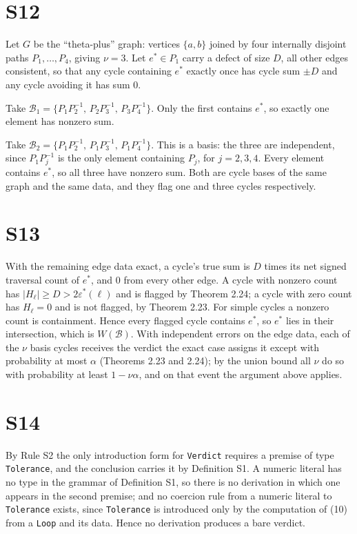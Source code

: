 \documentclass[11pt,a4paper]{article}
\theoremstyle{definition}
\theoremstyle{remark}
\newcommand{\abs}[1]{\lvert#1\rvert}
\newcommand{\eps}{\varepsilon}
\newcommand{\epsstar}{\eps^{\ast}}
\newcommand{\hol}{H}
\newcommand{\cf}[1]{\texttt{#1}}
\begin{document}
\section*{S12}
Let $G$ be the ``theta-plus'' graph: vertices $\{a,b\}$ joined by four
internally disjoint paths $P_1,\dots,P_4$, giving
$\nu = 3$. Let $e^{\ast}\in P_1$ carry a defect of size $D$, all other
edges consistent, so that any cycle containing $e^{\ast}$ exactly once
has cycle sum $\pm D$ and any cycle avoiding it has sum $0$.

Take $\mathcal{B}_1 = \{P_1P_2^{-1},\,P_2P_3^{-1},\,P_3P_4^{-1}\}$.
Only the first contains $e^{\ast}$, so exactly one element has nonzero
sum.

Take $\mathcal{B}_2 = \{P_1P_2^{-1},\,P_1P_3^{-1},\,P_1P_4^{-1}\}$.
This is a basis: the three are independent, since $P_1P_j^{-1}$ is the
only element containing $P_j$, for $j=2,3,4$. Every element
contains $e^{\ast}$, so all three have nonzero sum. Both are cycle bases
of the same graph and the same data, and they flag one and three cycles
respectively.

\section*{S13}
With the remaining edge data exact, a cycle's true sum is $D$ times its
net signed traversal count of $e^{\ast}$, and $0$ from every other edge.
A cycle with nonzero count has $\abs{\hol_\ell}\ge D>2\epsstar(\ell)$
and is flagged by Theorem 2.24; a cycle with zero count has
$\hol_\ell=0$ and is not flagged, by Theorem 2.23. For
simple cycles a nonzero count is containment. Hence every flagged cycle
contains $e^{\ast}$, so $e^{\ast}$ lies in their intersection, which is
$W(\mathcal{B})$. With independent errors on the edge data, each of the
$\nu$ basis cycles receives the verdict the exact case assigns it except
with probability at most $\alpha$ (Theorems 2.23 and 2.24); by the union bound all $\nu$ do so with probability at
least $1-\nu\alpha$, and on that event the argument above applies.

\section*{S14}
By Rule S2 the only introduction form for \cf{Verdict}
requires a premise of type \cf{Tolerance}, and the conclusion carries it
by Definition S1. A numeric literal has no type in the grammar of
Definition S1, so there is no derivation in which one appears in
the second premise; and no coercion rule from a numeric literal to
\cf{Tolerance} exists, since \cf{Tolerance} is introduced only by the
computation of (10) from a \cf{Loop} and its data. Hence
no derivation produces a bare verdict.
\end{document}
